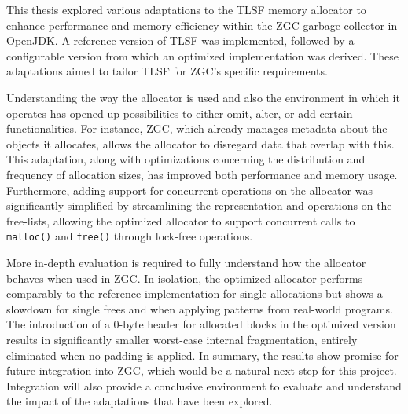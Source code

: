 
This thesis explored various adaptations to the TLSF memory allocator to enhance performance and memory efficiency within the ZGC garbage collector in OpenJDK. A reference version of TLSF was implemented, followed by a configurable version from which an optimized implementation was derived. These adaptations aimed to tailor TLSF for ZGC's specific requirements.

Understanding the way the allocator is used and also the environment in which it operates has opened up possibilities to either omit, alter, or add certain functionalities. For instance, ZGC, which already manages metadata about the objects it allocates, allows the allocator to disregard data that overlap with this. This adaptation, along with optimizations concerning the distribution and frequency of allocation sizes, has improved both performance and memory usage. Furthermore, adding support for concurrent operations on the allocator was significantly simplified by streamlining the representation and operations on the free-lists, allowing the optimized allocator to support concurrent calls to \texttt{malloc()} and \texttt{free()} through lock-free operations.

More in-depth evaluation is required to fully understand how the allocator behaves when used in ZGC. In isolation, the optimized allocator performs comparably to the reference implementation for single allocations but shows a slowdown for single frees and when applying patterns from real-world programs. The introduction of a 0-byte header for allocated blocks in the optimized version results in significantly smaller worst-case internal fragmentation, entirely eliminated when no padding is applied. In summary, the results show promise for future integration into ZGC, which would be a natural next step for this project. Integration will also provide a conclusive environment to evaluate and understand the impact of the adaptations that have been explored.

